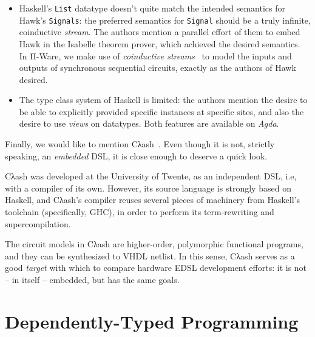             \begin{itemize}
                \item Haskell's \texttt{List} datatype doesn't quite match
                    the intended semantics for Hawk's \texttt{Signals}:
                    the preferred semantics for \texttt{Signal} should be a truly infinite, coinductive \emph{stream}.
                    The authors mention a parallel effort of them to embed Hawk in the Isabelle theorem prover,
                    which achieved the desired semantics.
                    In Π-Ware, we make use of \emph{coinductive streams}~\cite{introduction-coalgebra-jacobs}
                    to model the inputs and outputs of synchronous sequential circuits,
                    exactly as the authors of Hawk desired.
                \item The type class system of Haskell is limited: the authors mention the desire to be able
                    to explicitly provided specific instances at specific sites,
                    and also the desire to use \emph{views} on datatypes.
                    Both features are available on \emph{Agda}.
            \end{itemize}

            Finally, we would like to mention Cλash~\cite{clash-baaij}.
            Even though it is not, strictly speaking, an \emph{embedded} \ac{DSL},
            it is close enough to deserve a quick look.

            Cλash was developed at the University of Twente,
            as an independent \ac{DSL}, i.e, with a compiler of its own.
            However, its source language is strongly based on Haskell, and Cλash's compiler
            reuses several pieces of machinery from Haskell's toolchain (specifically, GHC),
            in order to perform its term-rewriting and supercompilation.

            The circuit models in Cλash are higher-order, polymorphic functional programs,
            and they can be synthesized to \ac{VHDL} netlist.
            In this sense, Cλash serves as a good \emph{target} with which to compare hardware
            \ac{EDSL} development efforts: it is not -- in itself -- embedded, but has the same goals.


    \section{Dependently-Typed Programming}
    \label{sec:dtp}

